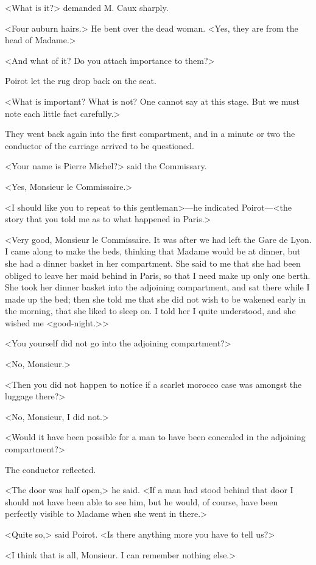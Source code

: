 <What is it?> demanded M. Caux sharply.

<Four auburn hairs.> He bent over the dead woman. <Yes, they are from the head of Madame.>

<And what of it? Do you attach importance to them?>

Poirot let the rug drop back on the seat.

<What is important? What is not? One cannot say at this stage. But we must note each little fact carefully.>

They went back again into the first compartment, and in a minute or two the conductor of the carriage arrived to be questioned.

<Your name is Pierre Michel?> said the Commissary.

<Yes, Monsieur le Commissaire.>

<I should like you to repeat to this gentleman>—he indicated Poirot—<the story that you told me as to what happened in Paris.>

<Very good, Monsieur le Commissaire. It was after we had left the Gare de Lyon. I came along to make the beds, thinking that Madame would be at dinner, but she had a dinner basket in her compartment. She said to me that she had been obliged to leave her maid behind in Paris, so that I need make up only one berth. She took her dinner basket into the adjoining compartment, and sat there while I made up the bed; then she told me that she did not wish to be wakened early in the morning, that she liked to sleep on. I told her I quite understood, and she wished me <good-night.>>

<You yourself did not go into the adjoining compartment?>

<No, Monsieur.>

<Then you did not happen to notice if a scarlet morocco case was amongst the luggage there?>

<No, Monsieur, I did not.>

<Would it have been possible for a man to have been concealed in the adjoining compartment?>

The conductor reflected.

<The door was half open,> he said. <If a man had stood behind that door I should not have been able to see him, but he would, of course, have been perfectly visible to Madame when she went in there.>

<Quite so,> said Poirot. <Is there anything more you have to tell us?>

<I think that is all, Monsieur. I can remember nothing else.>

